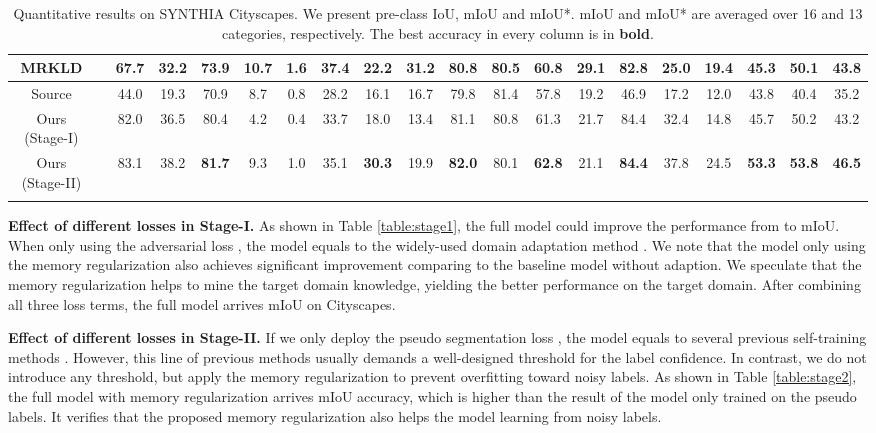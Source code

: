 \documentclass{article}
\begin{document}
\begin{table*}[!t]
{\begin{tabular}{c|c|cccccccccccccccc|c|c}
		MRKLD \cite{zou2019confidence} & & 67.7 & 32.2 & 73.9 & 10.7 & \textbf{1.6} & \textbf{37.4} & 22.2 & \textbf{31.2} & 80.8 & 80.5 & 60.8 & \textbf{29.1} & 82.8 & 25.0 & 19.4 & 45.3 & 50.1 & 43.8 \\
		\hline
Source & \multirow{3}{0.1\linewidth}{\centering{DeepLabv2}} & 44.0 & 19.3 & 70.9 & 8.7 & 0.8 & 28.2 & 16.1 & 16.7 & 79.8 & 81.4 & 57.8 & 19.2 & 46.9 & 17.2 & 12.0 & 43.8 & 40.4 & 35.2 \\
		Ours (Stage-I) & & 82.0 & 36.5 & 80.4 & 4.2 & 0.4 & 33.7 & 18.0 & 13.4 & 81.1 & 80.8 & 61.3 & 21.7 & 84.4 & 32.4 & 14.8 & 45.7 & 50.2 & 43.2 \\
		Ours (Stage-II) & & 83.1 & 38.2 & \textbf{81.7} & 9.3 & 1.0 & 35.1 & \textbf{30.3} & 19.9 & \textbf{82.0} & 80.1 & \textbf{62.8} & 21.1 & \textbf{84.4} & 37.8 & 24.5 & \textbf{53.3} & \textbf{53.8} & \textbf{46.5} 
		\\
		\shline
	\end{tabular}
	}
	\vspace{-2.5mm}
	\caption{Quantitative results on SYNTHIA  Cityscapes. We present pre-class IoU, mIoU and mIoU*. mIoU and mIoU* are averaged over 16 and 13 categories, respectively. The best accuracy in every column is in \textbf{bold}.}
	\label{table:syncity}
\end{table*}

\noindent\textbf{Effect of different losses in Stage-I.}
As shown in Table \ref{table:stage1}, the full model could improve the performance from  to  mIoU. When only using the adversarial loss , the model equals to the widely-used domain adaptation method \cite{tsai2018learning}. We note that the model only using the memory regularization  also achieves significant improvement comparing to the baseline model without adaption. We speculate that the memory regularization helps to mine the target domain knowledge, yielding the better performance on the target domain. After combining all three loss terms, the full model arrives  mIoU on Cityscapes.

\noindent\textbf{Effect of different losses in Stage-II.} If we only deploy the pseudo segmentation loss , the model equals to several previous self-training methods \cite{zou2018unsupervised,zou2019confidence}. However, this line of previous methods usually demands a well-designed threshold for the label confidence. In contrast, we do not introduce any threshold, but apply the memory regularization to prevent overfitting toward noisy labels. As shown in Table \ref{table:stage2}, the full model with memory regularization arrives  mIoU accuracy, which is higher than the result of the model only trained on the pseudo labels. It verifies that the proposed memory regularization also helps the model learning from noisy labels.
\end{document}
